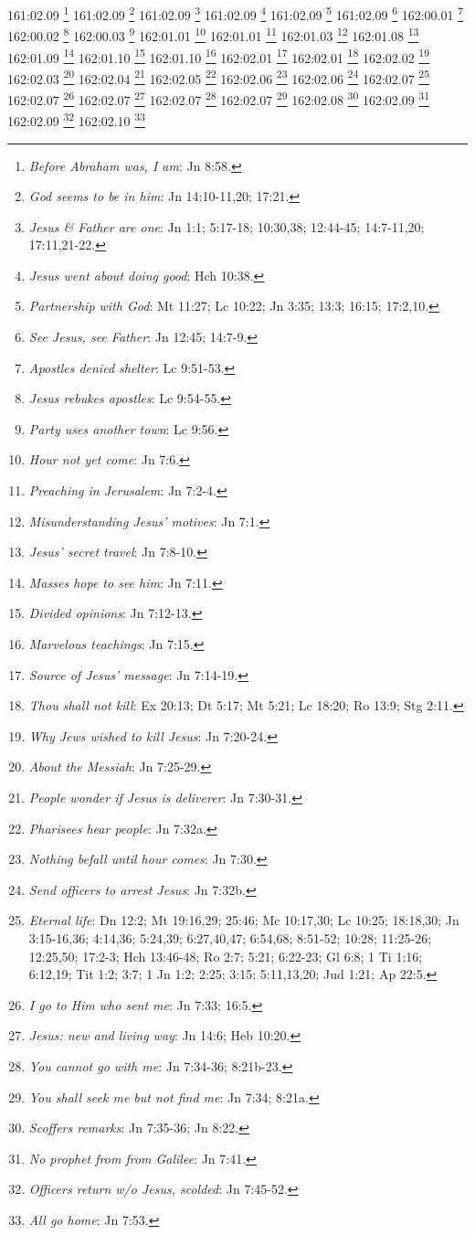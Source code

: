 {{{{{{{{{{{{{{{{{{{{{{{{{{{{{{{{{{{{161:02.09 \footnote{\textit{Before Abraham was, I am}: Jn 8:58.}
161:02.09 \footnote{\textit{God seems to be in him}: Jn 14:10-11,20; 17:21.}
161:02.09 \footnote{\textit{Jesus & Father are one}: Jn 1:1; 5:17-18; 10:30,38; 12:44-45; 14:7-11,20; 17:11,21-22.}
161:02.09 \footnote{\textit{Jesus went about doing good}: Hch 10:38.}
161:02.09 \footnote{\textit{Partnership with God}: Mt 11:27; Lc 10:22; Jn 3:35; 13:3; 16:15; 17:2,10.}
161:02.09 \footnote{\textit{See Jesus, see Father}: Jn 12:45; 14:7-9.}
162:00.01 \footnote{\textit{Apostles denied shelter}: Lc 9:51-53.}
162:00.02 \footnote{\textit{Jesus rebukes apostles}: Lc 9:54-55.}
162:00.03 \footnote{\textit{Party uses another town}: Lc 9:56.}
162:01.01 \footnote{\textit{Hour not yet come}: Jn 7:6.}
162:01.01 \footnote{\textit{Preaching in Jerusalem}: Jn 7:2-4.}
162:01.03 \footnote{\textit{Misunderstanding Jesus' motives}: Jn 7:1.}
162:01.08 \footnote{\textit{Jesus' secret travel}: Jn 7:8-10.}
162:01.09 \footnote{\textit{Masses hope to see him}: Jn 7:11.}
162:01.10 \footnote{\textit{Divided opinions}: Jn 7:12-13.}
162:01.10 \footnote{\textit{Marvelous teachings}: Jn 7:15.}
162:02.01 \footnote{\textit{Source of Jesus' message}: Jn 7:14-19.}
162:02.01 \footnote{\textit{Thou shall not kill}: Ex 20:13; Dt 5:17; Mt 5:21; Lc 18:20; Ro 13:9; Stg 2:11.}
162:02.02 \footnote{\textit{Why Jews wished to kill Jesus}: Jn 7:20-24.}
162:02.03 \footnote{\textit{About the Messiah}: Jn 7:25-29.}
162:02.04 \footnote{\textit{People wonder if Jesus is deliverer}: Jn 7:30-31.}
162:02.05 \footnote{\textit{Pharisees hear people}: Jn 7:32a.}
162:02.06 \footnote{\textit{Nothing befall until hour comes}: Jn 7:30.}
162:02.06 \footnote{\textit{Send officers to arrest Jesus}: Jn 7:32b.}
162:02.07 \footnote{\textit{Eternal life}: Dn 12:2; Mt 19:16,29; 25:46; Mc 10:17,30; Lc 10:25; 18:18,30; Jn 3:15-16,36; 4:14,36; 5:24,39; 6:27,40,47; 6:54,68; 8:51-52; 10:28; 11:25-26; 12:25,50; 17:2-3; Hch 13:46-48; Ro 2:7; 5:21; 6:22-23; Gl 6:8; 1 Ti 1:16; 6:12,19; Tit 1:2; 3:7; 1 Jn 1:2; 2:25; 3:15; 5:11,13,20; Jud 1:21; Ap 22:5.}
162:02.07 \footnote{\textit{I go to Him who sent me}: Jn 7:33; 16:5.}
162:02.07 \footnote{\textit{Jesus: new and living way}: Jn 14:6; Heb 10:20.}
162:02.07 \footnote{\textit{You cannot go with me}: Jn 7:34-36; 8:21b-23.}
162:02.07 \footnote{\textit{You shall seek me but not find me}: Jn 7:34; 8:21a.}
162:02.08 \footnote{\textit{Scoffers remarks}: Jn 7:35-36; Jn 8:22.}
162:02.09 \footnote{\textit{No prophet from from Galilee}: Jn 7:41.}
162:02.09 \footnote{\textit{Officers return w/o Jesus, scolded}: Jn 7:45-52.}
162:02.10 \footnote{\textit{All go home}: Jn 7:53.}
}}}}}}}}}}}}}}}}}}}}}}}}}}}}}}}}}}}}

